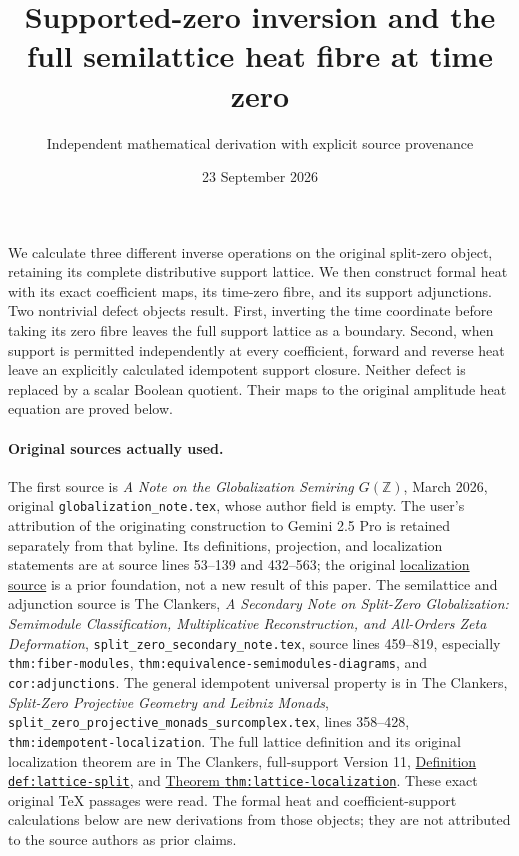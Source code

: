 \documentclass[11pt]{article}
\title{Supported-zero inversion and the full semilattice heat fibre at time zero}
\author{Independent mathematical derivation with explicit source provenance}
\date{23 September 2026}
\newcommand{\Z}{\mathbb Z}
\begin{document}
\maketitle

We calculate three different inverse operations on the original
split-zero object, retaining its complete distributive support lattice.
We then construct formal heat with its exact coefficient maps, its
time-zero fibre, and its support adjunctions.  Two nontrivial defect
objects result.  First, inverting the time coordinate before taking
its zero fibre leaves the full support lattice as a boundary.
Second, when support is permitted independently at every coefficient,
forward and reverse heat leave an explicitly calculated idempotent
support closure.  Neither defect is replaced by a scalar Boolean
quotient.  Their maps to the original amplitude heat equation are
proved below.

\paragraph{Original sources actually used.}
The first source is \emph{A Note on the Globalization Semiring
$G(\Z)$}, March 2026, original \texttt{globalization\_note.tex},
whose author field is empty.  The user's attribution of the originating
construction to Gemini 2.5 Pro is retained separately from that
byline.  Its definitions, projection, and localization statements are
at source lines 53--139 and 432--563; the original
\href{https://github.com/KokunoYumeto/zeta-function-research-reader/blob/d2f0020a7c446f429682925c1c682d99ba86a4cc/workbenches/splitzero-tandem/foundations/globalization-semiring/globalization_note.tex#L432}{localization source}
is a prior foundation, not a new result of this paper.
The semilattice and adjunction source is The Clankers,
\emph{A Secondary Note on Split-Zero Globalization:
Semimodule Classification, Multiplicative Reconstruction, and
All-Orders Zeta Deformation},
\texttt{split\_zero\_secondary\_note.tex},
source lines 459--819, especially
\texttt{thm:fiber-modules}, \texttt{thm:equivalence-semimodules-diagrams},
and \texttt{cor:adjunctions}.
The general idempotent universal property is in The Clankers,
\emph{Split-Zero Projective Geometry and Leibniz Monads},
\texttt{split\_zero\_projective\_monads\_surcomplex.tex},
lines 358--428, \texttt{thm:idempotent-localization}.
The full lattice definition and its original localization theorem are
in The Clankers, full-support Version 11,
\href{https://github.com/KokunoYumeto/zeta-function-research-reader/blob/a2851f9eb352e7e4376bc629de86fa4ed9c1c434/workbenches/splitzero-tandem/foundations/split-support-geometry-v11/split_support_geometry_arithmetic_curve_v11.tex#L1228}{Definition \texttt{def:lattice-split}},
and
\href{https://github.com/KokunoYumeto/zeta-function-research-reader/blob/a2851f9eb352e7e4376bc629de86fa4ed9c1c434/workbenches/splitzero-tandem/foundations/split-support-geometry-v11/split_support_geometry_arithmetic_curve_v11.tex#L1456}{Theorem \texttt{thm:lattice-localization}}.
These exact original TeX passages were read. The formal heat and
coefficient-support calculations below are new derivations from those
objects; they are not attributed to the source authors as prior claims.
\end{document}
